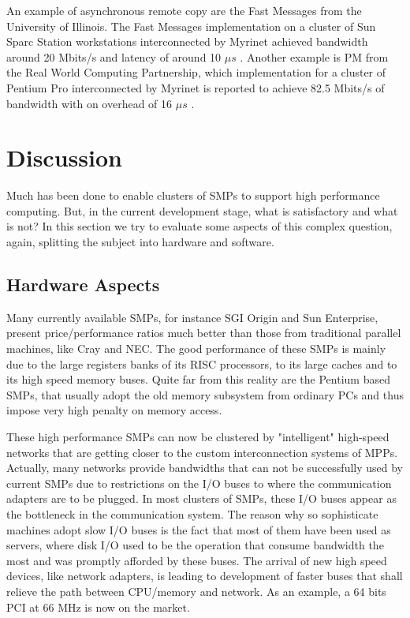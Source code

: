 \begin{itemize}
	An example of asynchronous remote copy are the Fast Messages from the University of Illinois. The Fast Messages implementation on a cluster of Sun Sparc Station workstations interconnected by Myrinet achieved bandwidth around 20 Mbits/s and latency of around 10 $\mu s$ \cite{Pakin:97}. Another example is PM from the Real World Computing Partnership, which implementation for a cluster of Pentium Pro interconnected by Myrinet is reported to achieve 82.5 Mbits/s of bandwidth with on overhead of 16 $\mu s$ \cite{Tanaka:98}.
	
\end{itemize}


\section{\label{disc}Discussion}

Much has been done to enable clusters of SMPs to support high performance computing. But, in the current development stage, what is satisfactory and what is not? In this section we try to evaluate some aspects of this complex question, again, splitting the subject into hardware and software.


\subsection{\label{disc_hard}Hardware Aspects}

	Many currently available SMPs, for instance SGI Origin and Sun Enterprise, present price/performance ratios much better than those from traditional parallel machines, like Cray and NEC. The good performance of these  SMPs is mainly due to the large registers banks of its RISC processors, to its large caches and to its high speed memory buses. Quite far from this reality are the Pentium based SMPs, that usually adopt the old memory subsystem from ordinary PCs and thus impose very high penalty on memory access.
	
	These high performance SMPs can now be clustered by "intelligent" high-speed networks that are getting closer to the custom interconnection systems of MPPs. Actually, many networks provide bandwidths that can not be successfully used by current SMPs due to restrictions on the I/O buses to where the communication adapters are to be plugged. In most clusters of SMPs, these I/O buses appear as the bottleneck in the communication system. The reason why so sophisticate machines adopt slow I/O buses is the fact that most of them have been used as servers, where disk I/O used to be the operation that consume bandwidth the most and was promptly afforded by these buses. The arrival of new high speed devices, like network adapters, is leading to development of faster buses that shall relieve the path between CPU/memory and network. As an example, a 64 bits PCI at 66 MHz is now on the market.
	
